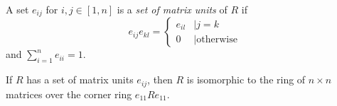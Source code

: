   \begin{definition}
    \label{def:matrixunits}
    A set $e_{ij}$ for $i, j \in [1, n]$ is a \textit{set of matrix units} of $R$ if 
    $$
      e_{ij}e_{kl} = 
      \begin{cases} 
        e_{il} &\mid j = k \\ 
        0 &\mid \text{otherwise} \end{cases}
    $$ 
    and $\sum_{i=1}^n e_{ii} = 1$.
  \end{definition}

  \begin{theorem}
      \label{thm:ring_with_matrix_units}
      If $R$ has a set of matrix units $e_{ij}$, then $R$ is isomorphic to the ring of $n \times n$ matrices over the corner ring $e_{11}Re_{11}$.
  \end{theorem}
